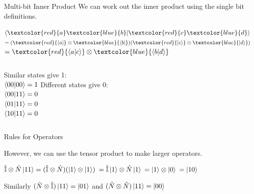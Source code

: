 \documentclass{beamer}
\begin{document}
\begin{frame}{Multi-bit Inner Product}
We can work out the inner product using the single bit definitions.\vfill
\begin{center}
\begin{math}
    \bra{\textcolor{red}{a}\textcolor{blue}{b}}\ket{\textcolor{red}{c}\textcolor{blue}{d}}
\end{math}\vfill
\begin{math}
    =(\textcolor{red}{\bra{a}} \otimes \textcolor{blue}{\bra{b}})(\textcolor{red}{\ket{c}} \otimes \textcolor{blue}{\ket{d}})
\end{math}\vfill
\begin{math}
    =\textcolor{red}{\braket{a}{c}} \otimes \textcolor{blue}{\braket{b}{d}}
\end{math}\vfill
\end{center}
\pause
\begin{columns}
    \centering
    Similar states give 1:\\
    \begin{math}
        \braket{00}{00} = 1
    \end{math}
    \centering
    Different states give 0:\\
    \begin{math}
        \braket{00}{11} = 0
    \end{math}\\
    \begin{math}
        \braket{01}{11} = 0
    \end{math}\\
    \begin{math}
        \braket{10}{11} = 0
    \end{math}
    \end{columns}
\end{frame}

\begin{frame}{Rules for Operators}

However, we can use the tensor product to make larger operators.
    \vfill

    \centering
    \begin{math}
    \hat{\mathbb{I}}\otimes\hat{N}\ket{11} = (\hat{\mathbb{I}}\otimes\hat{N})(\ket{1}\otimes\ket{1})
    \end{math}\vfill
    \begin{math}
    = \hat{\mathbb{I}}\ket{1}\otimes\hat{N}\ket{1}
    \end{math}\vfill
    \begin{math}
    = \ket{1}\otimes\ket{0}
    \end{math}\vfill
    \begin{math}
    = \ket{10}
    \end{math}
\vfill

Similarly $(\hat{N}\otimes\hat{\mathbb{I}})\ket{11}=\ket{01}$ 
and $(\hat{N}\otimes\hat{N})\ket{11}=\ket{00}$
\end{frame}
\end{document}
